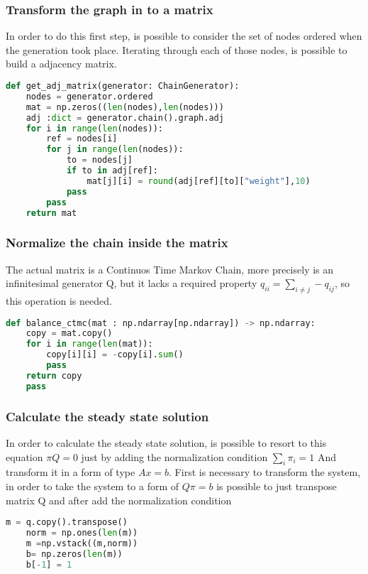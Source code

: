 \documentclass[12pt,a4paper]{article}
\begin{document}
\subsubsection{Transform the graph in to a matrix}
In order to do this first step, is possible to consider the set of nodes ordered when the generation took place. Iterating through each of those nodes, is possible to build a adjacency matrix.
\begin{lstlisting}[language=python]
   def get_adj_matrix(generator: ChainGenerator):
    nodes = generator.ordered
    mat = np.zeros((len(nodes),len(nodes)))
    adj :dict = generator.chain().graph.adj
    for i in range(len(nodes)):
        ref = nodes[i]
        for j in range(len(nodes)):
            to = nodes[j]
            if to in adj[ref]:
                mat[j][i] = round(adj[ref][to]["weight"],10)
            pass
        pass
    return mat
\end{lstlisting}

\subsubsection{Normalize the chain inside the matrix}
The actual matrix is a Continuos Time Markov Chain, more precisely is an infinitesimal generator Q, but it lacks a required property $q_{ii}=\sum_{i \neq j} - q_{ij}$, so this operation is needed.

\begin{lstlisting}[language=python]
  def balance_ctmc(mat : np.ndarray[np.ndarray]) -> np.ndarray:
    copy = mat.copy()
    for i in range(len(mat)):
        copy[i][i] = -copy[i].sum()
        pass
    return copy
    pass
\end{lstlisting}

\subsubsection{Calculate the steady state solution}

In order to calculate the steady state solution, is possible to resort to this equation $\pi Q=0$  just by adding the normalization condition $\sum_i \pi_i = 1$ And transform it in a form of type $Ax=b$. First is necessary to transform the system, in order to take the system to a form of $Q \pi=b$ is possible to just transpose matrix Q and after add the normalization condition

\begin{lstlisting}[language=python]
    m = q.copy().transpose()
    norm = np.ones(len(m))
    m =np.vstack((m,norm))
    b= np.zeros(len(m))
    b[-1] = 1
\end{lstlisting}
\end{document}
